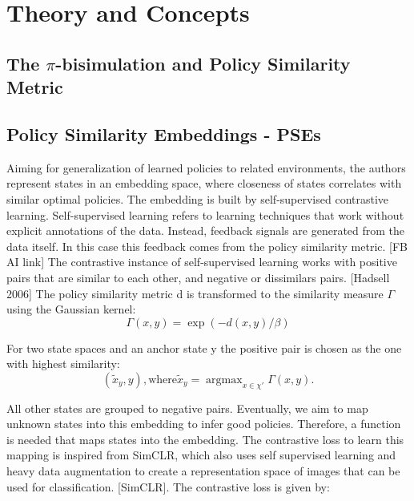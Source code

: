\documentclass{usiinftr}
\DeclareMathOperator*{\argmax}{argmax}
\begin{document}
\section{Theory and Concepts}
\subsection{The $\pi$-bisimulation and Policy Similarity Metric}

\subsection{Policy Similarity Embeddings - PSEs}
Aiming for generalization of learned policies to related environments, the authors represent states in an embedding space, where closeness of states correlates with similar optimal policies. The embedding is built by self-supervised contrastive learning. Self-supervised learning refers to learning techniques that work without explicit annotations of the data. Instead, feedback signals are generated from the data itself. In this case this feedback comes from the policy similarity metric. [FB AI link] The contrastive instance of self-supervised learning works with positive pairs that are similar to each other, and negative or dissimilars pairs. [Hadsell 2006] The policy similarity metric d is transformed to the similarity measure $\Gamma$ using the Gaussian kernel:
\begin{equation} \label{Gaussian Kernel}
\Gamma (x,y) = \exp ( -d(x,y)/ \beta) 
\end{equation}

For two state spaces and an anchor state y the positive pair is chosen as the one with highest similarity: 
\begin{equation} \label{positive pairs}
{( \tilde{x}_y , y) }, \text{where} \tilde{x}_y = \argmax_{x \in \chi'} \Gamma (x,y) .
\end{equation}

All other states are grouped to negative pairs. Eventually, we aim to map unknown states into this embedding to infer good policies. Therefore, a function is needed that maps states into the embedding. The contrastive loss to learn this mapping is inspired from SimCLR, which also uses self supervised learning and heavy data augmentation to create a representation space of images that can be used for classification. [SimCLR]. The contrastive loss is given by: 
\end{document}
